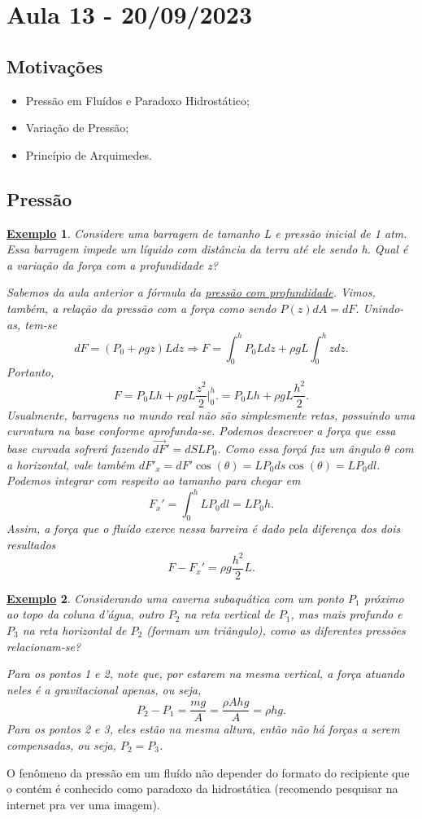\documentclass{article}
\newtheorem{example}{\underline{Exemplo}}
\begin{document}
\section{Aula 13 - 20/09/2023}
\subsection{Motivações}
\begin{itemize}
  \item Pressão em Fluídos e Paradoxo Hidrostático;
  \item Variação de Pressão;
  \item Princípio de Arquimedes.
\end{itemize}
\subsection{Pressão}
\begin{example}
  Considere uma barragem de tamanho L e pressão inicial de 1 atm. Essa barragem impede um líquido com distância da terra até ele sendo h.
  Qual é a variação da força com a profundidade z?

  Sabemos da aula anterior a fórmula da \textit{\hyperlink{pressure_submerging}{pressão com profundidade}}. Vimos, também, a relação da pressão com a força
  como sendo \(P(z)dA = dF\). Unindo-as, tem-se 
  \[
    dF = (P_{0}+\rho gz)Ldz \Rightarrow F = \int_{0}^{h}P_{0}Ldz + \rho gL \int_{0}^{h}z dz.
  \]
  Portanto, 
  \[
    F = P_{0}Lh + \rho gL \frac{z^{2}}{2}\biggl|_{0}^{h}\biggr. = P_{0}Lh + \rho gL \frac{h^{2}}{2}.
  \]
  Usualmente, barragens no mundo real não são simplesmente retas, possuindo uma curvatura na base conforme aprofunda-se. Podemos descrever 
  a força que essa base curvada sofrerá fazendo \(\vec{dF}' = dS L P_{0}\). Como essa forçá faz um ângulo \(\theta \) com a horizontal, vale também
  \(dF'_{x} = dF'\cos{(\theta )} = LP_{0}ds\cos{(\theta )} = LP_{0}dl.\) Podemos integrar com respeito ao tamanho para chegar em 
  \[
    F_{x}' = \int_{0}^{h}LP_{0}dl = LP_{0}h.
  \]
  Assim, a força que o fluído exerce nessa barreira é dado pela diferença dos dois resultados 
  \[
    F - F_{x}' = \rho g \frac{h^{2}}{2}L.
  \]
\end{example}
\begin{example}
  Considerando uma caverna subaquática com um ponto \(P_{1}\) próximo ao topo da coluna d'água,
  outro \(P_{2}\) na reta vertical de \(P_{1}\), mas mais profundo e \(P_{3}\) na reta horizontal de \(P_{2}\) 
  (formam um triângulo), como as diferentes pressões relacionam-se?

  Para os pontos 1 e 2, note que, por estarem na mesma vertical, a força atuando neles é a gravitacional apenas, ou seja, 
  \[
    P_{2} - P_{1} = \frac{mg}{A} = \frac{\rho Ahg}{A} = \rho hg.
  \]
  Para os pontos 2 e 3, eles estão na mesma altura, então não há forças a serem compensadas, ou seja, \(P_{2} = P_{3}\).
\end{example}
O fenômeno da pressão em um fluído não depender do formato do recipiente que o contém é conhecido como paradoxo da hidrostática (recomendo pesquisar na internet pra ver uma imagem).
\end{document}
